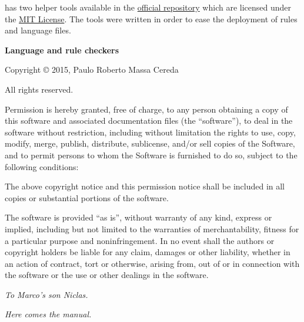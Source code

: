 \documentclass[a4paper,twoside,12pt]{memoir}
\begin{document}
{\ornamentline

\vspace{1em}

\arara has two helper tools available in the \href{https://github.com/cereda/arara}{official repository} which are licensed under the \href{http://opensource.org/licenses/MIT}{MIT License}. The tools were written in order to ease the deployment of rules and language files.

\vspace{1.5em}

{\sffamily\bfseries Language and rule checkers}

Copyright \copyright{} 2015, Paulo Roberto Massa Cereda

All rights reserved.

\vspace{1em}

Permission is hereby granted, free of charge, to any person obtaining a  copy  of this  software  and  associated documentation  files  (the ``software''), to  deal in the software without  restriction, including without limitation the rights to  use, copy, modify,  merge, publish, distribute, sublicense,  and/or sell  copies of  the Software,  and to permit persons to whom the Software  is furnished to do so, subject to the following conditions:

\vspace{1em}

The above copyright notice and this permission notice shall be included in all copies or substantial portions of the software.

\vspace{1em}

The software is provided ``as is'', without warranty of any kind, express or implied, including but not limited to the warranties of merchantability, fitness for a particular purpose and noninfringement. In no event shall the authors or copyright holders be liable for any claim, damages or other liability, whether in an action of contract, tort or otherwise, arising from, out of or in connection with the software or the use or other dealings in the software.

\ornamentline}

\cleardoublepage

\vspace*{25em}

\begin{flushright}
\em To Marco's son Niclas.
\end{flushright}

\cleardoublepage

\tableofcontents*

\cleardoublepage

\listoffigures*

\cleardoublepage

\listoftables*

\cleardoublepage

\listofcodes*

\mainmatter

\emph{Here comes the manual.}
\end{document}
